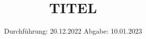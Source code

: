 



\subject{VERSUCH NUMMER}
\title{TITEL}
\date{%
  Durchführung: 20.12.2022
  \hspace{3em}
  Abgabe: 10.01.2023
}


\setlength{\parindent}{0pt} %

\maketitle
\thispagestyle{empty}
\tableofcontents
\newpage



%



\printbibliography{}


